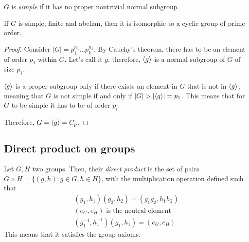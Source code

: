 \begin{definition}
  $G$ is \emph{simple} if it has no proper nontrivial normal subgroup. 
\end{definition}
\begin{corollary}
  If $G$ is simple, finite and abelian, then it is isomorphic to a cyclic group of prime order. 
\end{corollary}
\begin{proof}
  Consider $|G| = p_1^{n_1}...p_k^{n_k}$. By Cauchy's theorem, there has to be an element of order $p_1$ within $G$. Let's call it $g$. therefore, $\langle g \rangle$ is a normal subgroup of $G$ of size $p_1$. 
  
  $\langle g \rangle$ is a proper subgroup only if there exists an element in $G$ that is not in $\langle g \rangle$, meaning that $G$ is not simple if and only if $|G| > |\langle g \rangle| = p_1$. This means that for $G$ to be simple it has to be of order $p_i$.
  
  Therefore, $G = \langle g \rangle = C_p$. 
\end{proof}

\subsection{Direct product on groups}
\begin{definition}
  Let $G, H$ two groups. Then, their \emph{direct product} is the set of pairs $G\times H = \{(g, h): g \in G, h \in H\}$, with the multiplication operation defined such that
  \begin{gather*}
    (g_1, h_1)(g_2, h_2) = (g_1g_2, h_1h_2) \\
    (e_G, e_H) \text{ is the neutral element} \\
    (g_1^{-1}, h_1^{-1})(g_1, h_1) = (e_G, e_H)
  \end{gather*}
  This means that it satisfies the group axioms.
\end{definition}

